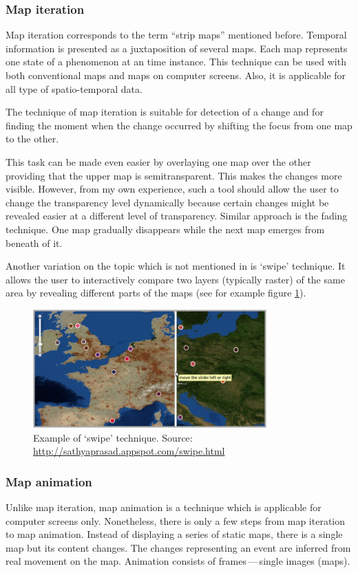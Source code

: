 \documentclass[a4paper,12pt,oneside]{book}
\newcommand{\dash}{\mbox{\,---\,}}
\begin{document}
\subsubsection{Map iteration}
\label{sec:mapIteration}
Map iteration corresponds to the term ``strip maps'' mentioned before.
Temporal information is presented as a juxtaposition of several maps.
Each map represents one state of a phenomenon at an time instance.
This technique can be used with both conventional maps and maps on computer screens.
Also, it is applicable for all type of spatio-temporal data.

The technique of map iteration is suitable
for detection of a change and for finding the moment when the change occurred
by shifting the focus from one map to the other.

This task can be made even easier by overlaying one map over the other providing that the upper map is semitransparent.
This makes the changes more visible.
However, from my own experience, such a tool should allow the user to change the transparency level dynamically
because certain changes might be revealed easier at a different level of transparency.
Similar approach is the fading technique.
One map gradually disappears while the next map emerges from beneath of it.

Another variation on the topic which is not mentioned in \cite{andrienko2003exploratory}
is `swipe' technique.
It allows the user to interactively compare two layers (typically raster)
of the same area by revealing different parts of the maps (see for example figure \ref{fig:swipe}).


\begin{figure}[h!]
  \centering
  \includegraphics[width=0.8\textwidth]{./images/swipe_example.png}
  \caption[Example of `swipe' technique]
  {Example of `swipe' technique. Source: \url{http://sathyaprasad.appspot.com/swipe.html}}
  \label{fig:swipe}
\end{figure}


\subsubsection{Map animation}
\label{sec:mapAnimation}
Unlike map iteration, map animation is a technique which is applicable for computer screens only.
Nonetheless, there is only a few steps from map iteration to map animation.
Instead of displaying a series of static maps, there is a single map but its content changes.
The changes representing an event are inferred from real movement on the map.
Animation consists of frames\dash single images (maps).
\end{document}
